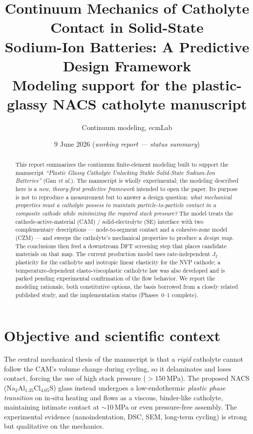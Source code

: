 \documentclass[11pt]{article}
\title{\textbf{Continuum Mechanics of Catholyte Contact in Solid-State\\
Sodium-Ion Batteries: A Predictive Design Framework}\\[4pt]
\large Modeling support for the plastic-glassy NACS catholyte manuscript}
\author{Continuum modeling, ecmLab}
\date{9 June 2026 \quad(\emph{working report --- status summary})}
\begin{document}
\maketitle

\begin{abstract}
\noindent
This report summarizes the continuum finite-element modeling built to support
the manuscript \emph{``Plastic Glassy Catholyte Unlocking Stable Solid-State
Sodium-Ion Batteries''} (Gan \textit{et al.}). The manuscript is wholly
experimental; the modeling described here is a \emph{new, theory-first
predictive framework} intended to open the paper. Its purpose is not to
reproduce a measurement but to answer a design question: \emph{what mechanical
properties must a catholyte possess to maintain particle-to-particle contact in
a composite cathode while minimizing the required stack pressure?} The model
treats the cathode-active-material (CAM) / solid-electrolyte (SE) interface with
two complementary descriptions --- node-to-segment contact and a cohesive-zone
model (CZM) --- and sweeps the catholyte's mechanical properties to produce a
\emph{design map}. The conclusions then feed a downstream DFT screening step
that places candidate materials on that map. The current production model uses
rate-independent $J_2$ plasticity for the catholyte and isotropic linear
elasticity for the NVP cathode; a temperature-dependent elasto-viscoplastic
catholyte law was also developed and is parked pending experimental confirmation
of the flow behavior. We report the modeling rationale, both constitutive
options, the basis borrowed from a closely related published study, and the
implementation status (Phases~0--1 complete).
\end{abstract}

\section{Objective and scientific context}

The central mechanical thesis of the manuscript is that a \emph{rigid} catholyte
cannot follow the CAM's volume change during cycling, so it delaminates and
loses contact, forcing the use of high stack pressure ($>150$\,MPa). The
proposed NACS (Na$_2$Al$_{1.35}$Cl$_{4.05}$S) glass instead undergoes a low-endothermic
\emph{plastic phase transition} on in-situ heating and flows as a viscous,
binder-like catholyte, maintaining intimate contact at $\sim$10\,MPa or even
pressure-free assembly. The experimental evidence (nanoindentation, DSC, SEM,
long-term cycling) is strong but qualitative on the mechanics.
\end{document}

